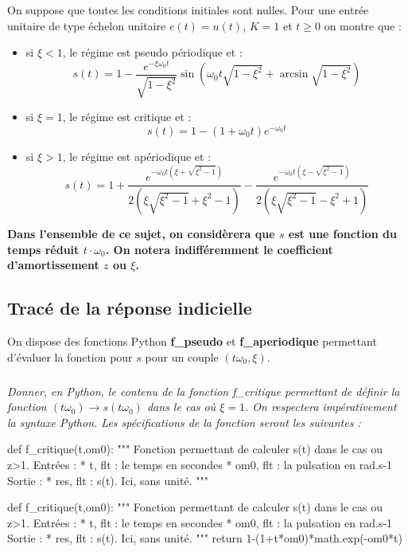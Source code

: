 \documentclass[10pt]{article}
\newif\ifprof
\begin{document}
\vspace{.5cm}

On suppose que toutes les conditions initiales sont nulles. Pour une entrée unitaire de type échelon unitaire $e(t)=u(t)$, $K=1$ et $t\geq0$ on montre que : 
\begin{itemize}
\item si $\xi <1$, le régime est pseudo périodique et :
$$
s(t)=1-\dfrac{e^{-\xi\omega_0 t}}{\sqrt{1-\xi^2}}\sin\left(  \omega_0 t\sqrt{1-\xi^2}+\arcsin \sqrt{1-\xi^2} \right)
$$
\item si $\xi=1$, le régime est critique et : 
$$
s(t)=1-\left(1+\omega_0 t \right)e^{-\omega_0 t} 
$$
\item si $\xi>1$, le régime est apériodique et : 
$$
s(t)=1
+\dfrac{e^{- \omega_0 t\left( \xi + \sqrt{\xi^2-1}\right)}}{2\left(\xi\sqrt{\xi^2-1}+\xi^2-1 \right)}
-\dfrac{e^{- \omega_0 t \left( \xi - \sqrt{\xi^2-1}\right)}}{2\left(\xi\sqrt{\xi^2-1}-\xi^2+1 \right)}
$$
\end{itemize} 

\begin{center}
\textbf{Dans l'ensemble de ce sujet, on considèrera que $s$ est une fonction du temps réduit $t\cdot\omega_0$. On notera indifféremment le coefficient d'amortissement $z$ ou $\xi$.}
\end{center}
\fi


\newpage 

\subsection*{Tracé de la réponse indicielle}
\ifprof
\else
On dispose des fonctions Python \textbf{\textsf{f\_pseudo}} et \textbf{\textsf{f\_aperiodique}} permettant d'évaluer la fonction pour $s$ pour un couple $(t\omega_0,\xi)$.
\fi



\subparagraph{} \textit{Donner, en Python, le contenu de la fonction \textsf{f\_critique} permettant de définir la fonction $(t\omega_0) \rightarrow s(t\omega_0)$ dans le cas où $\xi=1$. On respectera impérativement la syntaxe Python. Les spécifications de la fonction seront les suivantes : }
\ifprof
\else
\begin{py}
\begin{python}
def f_critique(t,om0):
    """
    Fonction permettant de calculer s(t) dans le cas ou z>1. 
    Entrées :
        * t, flt : le temps en secondes
        * om0, flt : la pulsation en rad.s-1
    Sortie : 
        * res, flt : s(t). Ici, sans unité.
    """
\end{python}
\end{py}
\fi
\ifprof
\begin{corrige}
\begin{py}
\begin{python}
def f_critique(t,om0):
    """
    Fonction permettant de calculer s(t) dans le cas ou z>1. 
    Entrées :
        * t, flt : le temps en secondes
        * om0, flt : la pulsation en rad.s-1
    Sortie : 
        * res, flt : s(t). Ici, sans unité.
    """
    return 1-(1+t*om0)*math.exp(-om0*t) 
\end{python}
\end{py}
\end{corrige}
\else
\end{document}
